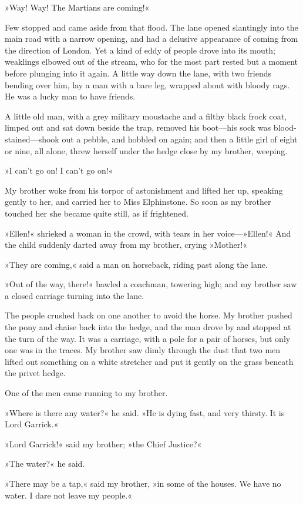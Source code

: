 »Way! Way! The Martians are coming!«

Few stopped and came aside from that flood. The lane opened slantingly into the main road with a narrow opening, and had a delusive appearance of coming from the direction of London. Yet a kind of eddy of people drove into its mouth; weaklings elbowed out of the stream, who for the most part rested but a moment before plunging into it again. A little way down the lane, with two friends bending over him, lay a man with a bare leg, wrapped about with bloody rags. He was a lucky man to have friends.

A little old man, with a grey military moustache and a filthy black frock coat, limped out and sat down beside the trap, removed his boot—his sock was blood-stained—shook out a pebble, and hobbled on again; and then a little girl of eight or nine, all alone, threw herself under the hedge close by my brother, weeping.

»I can't go on! I can't go on!«

My brother woke from his torpor of astonishment and lifted her up, speaking gently to her, and carried her to Miss Elphinstone. So soon as my brother touched her she became quite still, as if frightened.

»Ellen!« shrieked a woman in the crowd, with tears in her voice—»Ellen!« And the child suddenly darted away from my brother, crying »Mother!«

»They are coming,« said a man on horseback, riding past along the lane.

»Out of the way, there!« bawled a coachman, towering high; and my brother saw a closed carriage turning into the lane.

The people crushed back on one another to avoid the horse. My brother pushed the pony and chaise back into the hedge, and the man drove by and stopped at the turn of the way. It was a carriage, with a pole for a pair of horses, but only one was in the traces. My brother saw dimly through the dust that two men lifted out something on a white stretcher and put it gently on the grass beneath the privet hedge.

One of the men came running to my brother.

»Where is there any water?« he said. »He is dying fast, and very thirsty. It is Lord Garrick.«

»Lord Garrick!« said my brother; »the Chief Justice?«

»The water?« he said.

»There may be a tap,« said my brother, »in some of the houses. We have no water. I dare not leave my people.«


